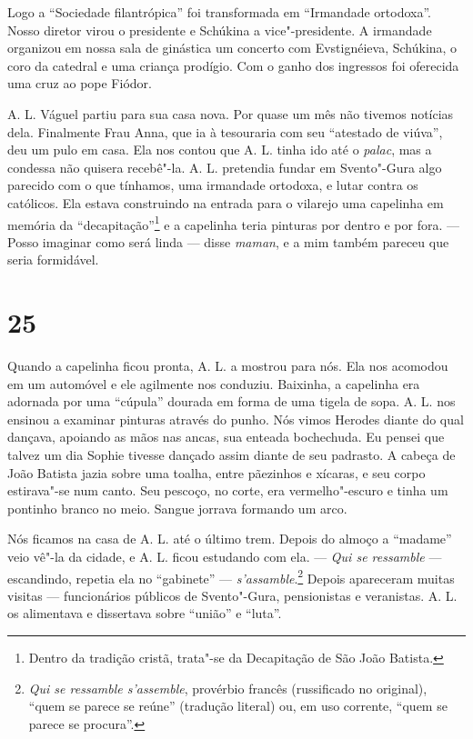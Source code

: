 Logo a ``Sociedade filantrópica'' foi transformada em ``Irmandade
ortodoxa''. Nosso diretor virou o presidente e Schúkina a
vice"-presidente. A irmandade organizou em nossa sala de ginástica um
concerto com Evstignéieva, Schúkina, o coro da catedral e uma criança
prodígio. Com o ganho dos ingressos foi oferecida uma cruz ao pope
Fiódor.

A. L. Váguel partiu para sua casa nova. Por quase um mês não tivemos
notícias dela. Finalmente Frau Anna, que ia à tesouraria com seu
``atestado de viúva'', deu um pulo em casa. Ela nos contou que A. L.
tinha ido até o \emph{palac}, mas a condessa não quisera recebê"-la. A.
L. pretendia fundar em Svento"-Gura algo parecido com o que tínhamos, uma
irmandade ortodoxa, e lutar contra os católicos. Ela estava construindo
na entrada para o vilarejo uma capelinha em memória da
``decapitação''\footnote{Dentro da tradição cristã, trata"-se da
  Decapitação de São João Batista.} e a capelinha teria pinturas por
dentro e por fora. --- Posso imaginar como será linda --- disse
\emph{maman}, e a mim também pareceu que seria formidável.

\section{25}

Quando a capelinha ficou pronta, A. L. a mostrou para nós. Ela nos
acomodou em um automóvel e ele agilmente nos conduziu. Baixinha, a
capelinha era adornada por uma ``cúpula'' dourada em forma de uma tigela
de sopa. A. L. nos ensinou a examinar pinturas através do punho. Nós
vimos Herodes diante do qual dançava, apoiando as mãos nas ancas, sua
enteada bochechuda. Eu pensei que talvez um dia Sophie tivesse dançado
assim diante de seu padrasto. A cabeça de João Batista jazia sobre uma
toalha, entre pãezinhos e xícaras, e seu corpo estirava"-se num canto.
Seu pescoço, no corte, era vermelho"-escuro e tinha um pontinho branco no
meio. Sangue jorrava formando um arco.

Nós ficamos na casa de A. L. até o último trem. Depois do almoço a
``madame'' veio vê"-la da cidade, e A. L. ficou estudando com ela. ---
\emph{Qui se ressamble} --- escandindo, repetia ela no ``gabinete'' ---
\emph{s'assamble}.\footnote{\emph{Qui se ressamble s'assemble},
  provérbio francês (russificado no original), ``quem se parece se
  reúne'' (tradução literal) ou, em uso corrente, ``quem se parece se
  procura''.} Depois apareceram muitas visitas --- funcionários públicos
de Svento"-Gura, pensionistas e veranistas. A. L. os alimentava e
dissertava sobre ``união'' e ``luta''.

